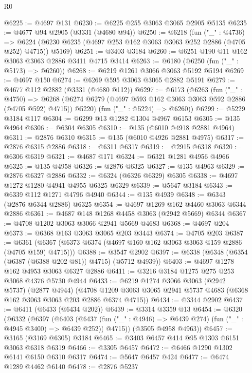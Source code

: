 \begin{lexlean}{R0}
\begin{coremodule}
@6225 := @4697 @131
@6230 := @6225 @255 @3063 @3065 @2905 @5135
@6235 := @4677 @94 @2905 (@3331 (@4680 @94))
@6250 := @6218
    (fun ("_" : @4736) =>
    @6224 (@6230 @6235 (@4697 @253 @162 @3063 @3063 @252 @2886 (@4705 @252) @4715)) @5169)
@6251 := @3403 @3184
@6260 := @6251 @190 @11 @162 @3063 @3063 @2886 @3411 @4715 @3414
@6263 := @6180 (@6250 (fun ("_" : @5173) => @6260))
@6268 := @6219 @1261 @3066 @3063 @5192 @5194
@6269 := @4697 @150
@6274 := @6269 @595 @3063 @3065 @2882 @5191
@6279 := @4677 @112 @2882 (@3331 (@4680 @112))
@6297 := @6173
    (@6263
      (fun ("_" : @4750) =>
      @6268 (@6274 @6279 (@4697 @593 @162 @3063 @3063 @592 @2886 (@4705 @592) @4715)) @5220)
      (fun ("_" : @5224) => @6260))
@6299 := @5229 @3184 @117
@6304 := @6299 @13 @1282 @1304 @4967 @6153
@6305 := @135 @4964
@6306 := @6304 @6305
@6310 := @135 (@6010 @4918 @2881 @4964)
@6311 := @2876 @6310
@6315 := @135 (@6010 @4926 @2881 @4975)
@6317 := @2876 @6315 @2886
@6318 := @6311 @6317
@6319 := @2915 @6318
@6320 := @6306 @6319
@6321 := @4687 @171
@6324 := @6321 @1281 @4956 @4966
@6325 := @135 @4958
@6326 := @2876 @6325
@6327 := @135 @4963
@6329 := @2876 @6327 @2886
@6332 := @6324 (@6326 @6329) @6305
@6338 := @4697 @1272 @1280 @4941 @4955 @6325 @6329
@6339 := @5647 @3184
@6343 := @6339 @112 @1271 @4796 @4940
@6344 := @135 @4939
@6348 := @6343 (@2876 @6344 @2886) @6325
@6354 := @4697 @1269 @162 @4460 @3063 @6344 @2886
@6361 := @4687 @148 @1268 @4458 @3063 (@2942 @5669) @6344
@6367 := @4708 @1202 @3063 @3066 @2941 @5669 @4683
@6368 := @4697 @204
@6373 := @6368 @163 @3063 @3065 @203 @3443
@6374 := @4705 @203
@6387 := @6361 (@6367 (@6373 @6374 (@4697 @160 @162 @3063 @3063 @159 @2886 (@4705 @159) @4715)))
@6388 := @3547 @2902
@6397 := @6338 (@6348 (@6354 (@6387 (@6388 @202 @81)) @4715) (@5712 @4939))
@6403 := @4697 @1278 @162 @4953 @3063 @6327 @2886
@6411 := @3216 @3184 @1275 @275 @253 @3068 @4376 @5730 @4944
@6433 := @6219
    @1274
    @3066
    @3063
    (@2942 @5737)
    (@2877 @4944)
    (@4708 @1209 @3063 @3065 @2941 @5737 @4683 (@6368 @162 @3063 @3063 @203 @2886 @6374 @4715))
@6434 := @3344 @2902
@6437 := @6411 (@6433 (@6434 @202))
@6439 := @3314 @3359 @13
@6454 := @6320
    (@6332
      (@6397
        (@6403
          (@6437 (fun ("_" : @4946) => @6439 @274) (fun ("_" : @4945 @3400) => @6439 @252))
          @4715))
      (@3505 @4958 @4963))
@6457 := @3165 (@3169 @6305) @3184
@6465 := @3403 @6457 @414 @95 @1303 @6151 @3063 @6318 @6319
@6466 := @3305 @6457
@6472 := @6466 @1290 @1302 @6141 @6150 @6310 @6317
@6474 := @5647 @6457 @424
@6477 := @6474 @1289 @4462 @6140
@6478 := @2876 @5237

\end{coremodule}
\end{lexlean}
